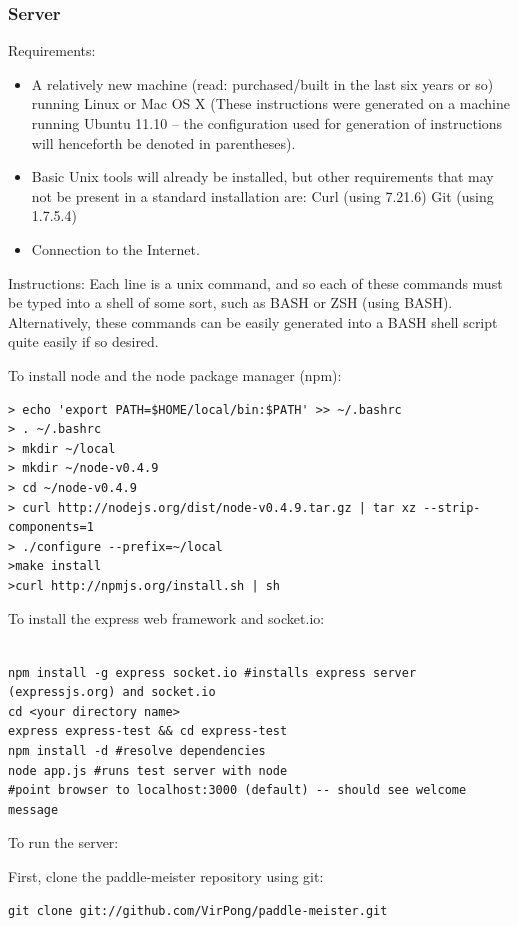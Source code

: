 \documentclass[letterpaper,12pt]{article}
\begin{document}
\subsubsection{Server}
Requirements:
\begin{itemize}
\item A relatively new machine (read: purchased/built in the last six years or so) running Linux or Mac OS X (These instructions were generated on a machine running Ubuntu 11.10 -- the configuration used for generation of instructions will henceforth be denoted in parentheses).
\item Basic Unix tools will already be installed, but other requirements that may not be present in a standard installation are:
Curl (using 7.21.6)
Git (using 1.7.5.4)
\item Connection to the Internet. 
\end{itemize}
Instructions:
Each line is a unix command, and so each of these commands must be typed into a shell of some sort, such as BASH or ZSH (using BASH). Alternatively, these commands can be easily generated into a BASH shell script quite easily if so desired.

To install node and the node package manager (npm):

\begin{verbatim}
> echo 'export PATH=$HOME/local/bin:$PATH' >> ~/.bashrc
> . ~/.bashrc
> mkdir ~/local
> mkdir ~/node-v0.4.9
> cd ~/node-v0.4.9
> curl http://nodejs.org/dist/node-v0.4.9.tar.gz | tar xz --strip-components=1
> ./configure --prefix=~/local
>make install
>curl http://npmjs.org/install.sh | sh
\end{verbatim}

To install the express web framework and socket.io:

\begin{verbatim}

npm install -g express socket.io #installs express server (expressjs.org) and socket.io
cd <your directory name>
express express-test && cd express-test
npm install -d #resolve dependencies
node app.js #runs test server with node
#point browser to localhost:3000 (default) -- should see welcome message
\end{verbatim}

To run the server:

First, clone the paddle-meister repository using git:

\begin{verbatim}
git clone git://github.com/VirPong/paddle-meister.git
\end{verbatim}
\end{document}
